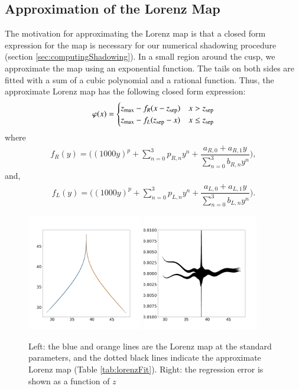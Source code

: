\documentclass[preprint,12pt]{elsarticle}
\begin{document}
\subsection{Approximation of the Lorenz Map}
\label{sec:lorenzMapApprox}
The motivation for approximating the Lorenz map is that a 
closed form expression for the map is necessary for our numerical shadowing procedure (section \ref{sec:computingShadowing}). In a small region around the cusp, we approximate the map using an exponential function. The tails on both sides are fitted with a sum of a cubic polynomial and a rational function. Thus, the approximate Lorenz map has the 
following closed form expression:
\begin{align}
    \varphi(x) = \begin{cases}
        z_{\rm max} - f_R(x - z_{\rm sep})   &  x > z_{\rm sep} \\
        z_{\rm max} -  f_L(z_{\rm sep} - x)   &  x \leq z_{\rm sep}
    \end{cases}
\end{align}
where 
\begin{align}
    f_R(y) = \Big( (1000 y)^p + 
        \sum_{n=0}^3 p_{R,n} y^n + \dfrac{a_{R,0} + a_{R,1} y}{\sum_{n=0}^3 b_{R,n} y^n}\Big),
\end{align}
and,
\begin{align}
    f_L(y) = \Big((1000 y)^p 
        + \sum_{n=0}^3 p_{L,n} y^n + \dfrac{a_{L,0} + a_{L,1}y}{\sum_{n=0}^3 b_{L,n} y^n}\Big).
\end{align}
\begin{figure}
		\includegraphics[width=0.45\textwidth]{lorenz_map_fit_lorenz_zmax_10_28_2.6666666666666665.npy.png}
		\includegraphics[width=0.45\textwidth]{lorenz_map_fit_error_lorenz_zmax_10_28_2.6666666666666665.npy.png}
		\caption{Left: the blue and orange lines are the Lorenz map at the standard parameters, and the dotted black lines indicate the approximate Lorenz map (Table \ref{tab:lorenzFit}). Right: the regression error is shown as a function of $z$} 
	\label{fig:lorenzMapComp}
\end{figure}
\end{document}
